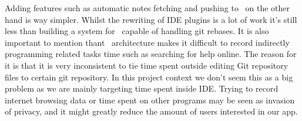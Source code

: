 Adding features such as automatic notes fetching and pushing to~ on the other hand is way simpler.
Whilst the rewriting of IDE plugins is a lot of work it's still less than building a system for~ capable of handling git rebases.
It is also important to mention thant~ architecture makes it difficult to record indirectly programming related tasks time
such as searching for help online.
The reason for it is that it is very inconsistent to tie time spent outside editing Git repository files to certain git repository.
In this project context we don't seem this as a big problem as we are mainly targeting time spent inside IDE.
Trying to record internet browsing data or time spent on other programs may be seen as invasion of privacy,
and it might greatly reduce the amount of users interested in our app.